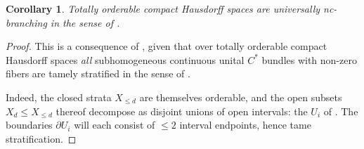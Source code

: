 \documentclass[11pt,leqno]{article}
\theoremstyle{plain}
\newtheorem{corollary}[lemma]{Corollary}
\theoremstyle{plain}
\theoremstyle{plain}
\numberwithin{equation}{section}
\theoremstyle{nonumberplain}
\newtheorem{proof}{Proof}
\newcommand\cA{{\mathcal A}}
\newcommand\1{{\bf 1}}
\begin{document}

\begin{corollary}\label{cor:ord.nc.brnch}
  Totally orderable compact Hausdorff spaces are universally nc-branching in the sense of . 
\end{corollary}
\begin{proof}
  This is a consequence of , given that over totally orderable compact Hausdorff spaces {\it all} subhomogeneous continuous unital $C^*$ bundles with non-zero fibers are tamely stratified in the sense of .

  Indeed, the closed strata $X_{\le d}$ are themselves orderable, and the open subsets $X_d\le X_{\le d}$ thereof decompose as disjoint unions of open intervals: the $U_i$ of . The boundaries $\partial U_i$ will each consist of $\le 2$ interval endpoints, hence tame stratification.
\end{proof}
\end{document}
